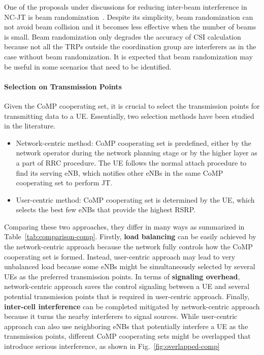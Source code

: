 \documentclass[a4paper,12pt]{article}%
\begin{document}
One of the proposals under discussions for reducing inter-beam interference in NC-JT is beam randomization~\cite{R1-1710180}. Despite its simplicity, beam randomization can not avoid beam collision and it becomes less effective when the number of beams is small. Beam randomization only degrades the accuracy of CSI calculation because not all the TRPs outside the coordination group are interferers as in the case without beam randomization. It is expected that beam randomization may be useful in some scenarios that need to be identified.

\paragraph{Selection on Transmission Points}

Given the CoMP cooperating set, it is crucial to select the transmission points for transmitting data to a UE. Essentially, two selection methods have been studied in the literature.
\begin{itemize}
\item Network-centric method: CoMP cooperating set is predefined, either by the network operator during the network planning stage or by the higher layer as a part of RRC procedure. The UE follows the normal attach procedure to find its serving eNB, which notifies other eNBs in the same CoMP cooperating set to perform JT.
\item User-centric method: CoMP cooperating set is determined by the UE, which selects the best few eNBs that provide the highest RSRP.
\end{itemize}

Comparing these two approaches, they differ in many ways as summarized in Table~\ref{tab:comparison-comp}. Firstly, \textbf{load balancing} can be easily achieved by the network-centric approach because the network fully controls how the CoMP cooperating set is formed. Instead, user-centric approach may lead to very unbalanced load because some eNBs might be simultaneously selected by several UEs as the preferred transmission points. In terms of \textbf{signaling overhead}, network-centric approach saves the control signaling between a UE and several potential transmission points that is required in user-centric approach. Finally, \textbf{inter-cell interference} can be completed mitigated by network-centric approach because it turns the nearby interferers to signal sources. While user-centric approach can also use neighboring eNBs that potentially interfere a UE as the transmission points, different CoMP cooperating sets might be overlapped that introduce serious interference, as shown in Fig.~\ref{fig:overlapped-comp}
\end{document}
